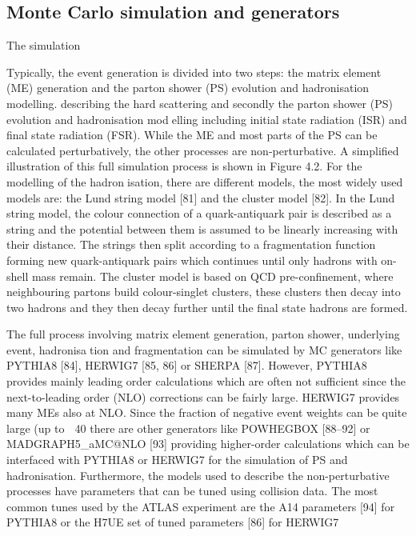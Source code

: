 \subsection{Monte Carlo simulation and generators}

The simulation 

Typically, the event generation is divided into two steps: the matrix element (ME) generation and the parton shower (PS) evolution and hadronisation modelling. 
describing the hard scattering and secondly the parton shower (PS) evolution and hadronisation modelling including initial state radiation (ISR) and final state radiation (FSR). While the ME and most
parts of the PS can be calculated perturbatively, the other processes are non-perturbative. A simplified
illustration of this full simulation process is shown in Figure 4.2. For the modelling of the hadronisation, there are different models, the most widely used models are: the Lund string model [81] and
the cluster model [82]. In the Lund string model, the colour connection of a quark-antiquark pair is
described as a string and the potential between them is assumed to be linearly increasing with their
distance. The strings then split according to a fragmentation function forming new quark-antiquark
pairs which continues until only hadrons with on-shell mass remain. The cluster model is based on
QCD pre-confinement, where neighbouring partons build colour-singlet clusters, these clusters then
decay into two hadrons and they then decay further until the final state hadrons are formed.

The full process involving matrix element generation, parton shower, underlying event, hadronisation and fragmentation can be simulated by MC generators like PYTHIA8 [84], HERWIG7 [85, 86]
or SHERPA [87]. However, PYTHIA8 provides mainly leading order calculations which are often not
sufficient since the next-to-leading order (NLO) corrections can be fairly large. HERWIG7 provides
many MEs also at NLO. Since the fraction of negative event weights can be quite large (up to
∼ 40%
there are other generators like POWHEGBOX [88–92] or MADGRAPH5_aMC@NLO [93] providing
higher-order calculations which can be interfaced with PYTHIA8 or HERWIG7 for the simulation of
PS and hadronisation.
Furthermore, the models used to describe the non-perturbative processes have parameters that can
be tuned using collision data. The most common tunes used by the ATLAS experiment are the A14
parameters [94] for PYTHIA8 or the H7UE set of tuned parameters [86] for HERWIG7


